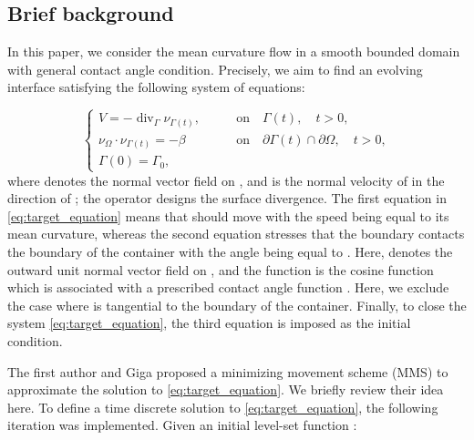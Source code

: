 \documentclass[11pt]{article}
\makeatletter
\numberwithin{equation}{section}
\newcommand{\R}{\mathbb{R}}
\def\ge{\geqslant}
\newcounter{mathrecordid}
\newcommand{\mathboxbegin}[1]{%
  \stepcounter{mathrecordid}%
  \immediate\write\mathrecords{\themathrecordid,#1}%
  \special{pdf:bann << /Type /Annot /Subtype /Link /Border [0 0 0]
    /MathBoxID \themathrecordid /F 2
    /A << /S /URI /URI (urn:mathbox:\themathrecordid) >> >>}}
\newcommand{\mathboxinlineplain}[1]{$#1$}
\newcommand{\mathboxinline}[1]{%
  $\mathboxbegin{inline}#1\special{pdf:eann}$}
\newcommand{\recordmath}{%
  \ifmeasuring@\expandafter\mathboxinlineplain
  \else\expandafter\mathboxinline\fi}
\makeatother
\begin{document}
\subsection{Brief background}

In this paper, we consider the mean curvature flow in a smooth bounded domain \recordmath{\Omega\subset\R^d\,(d\ge 2)} with general contact angle condition. Precisely, we aim to find an evolving interface \recordmath{\{\Gamma(t)\}_{t\ge 0}} satisfying the following system of equations:

\begin{equation}
\label{eq:target_equation}
    \begin{cases}
    V = - \operatorname{div}_{\Gamma}\nu_{\Gamma(t)},&\qquad \mbox{on}\quad \Gamma(t),\quad t > 0,\\
    \nu_\Omega\cdot\nu_{\Gamma(t)} = -\beta & \qquad\mbox{on}\quad \partial\Gamma(t)\cap \partial\Omega,\quad t > 0,\\
    \Gamma(0) = \Gamma_0,
    \end{cases}
\end{equation}
where \recordmath{\nu_{\Gamma(t)}} denotes the normal vector field on \recordmath{\Gamma(t)}, and \recordmath{V} is the normal velocity of \recordmath{\Gamma(t)} in the direction of \recordmath{\nu_{\Gamma(t)}}; the operator \recordmath{\operatorname{div}_\Gamma} designs the surface divergence. The first equation in \eqref{eq:target_equation} means that \recordmath{\Gamma(t)} should move with the speed being equal to its mean curvature, whereas the second equation stresses that the boundary \recordmath{\partial\Gamma(t)} contacts the boundary \recordmath{\partial\Omega} of the container \recordmath{\Omega} with the angle being equal to \recordmath{\arccos{(-\beta)}}. Here, \recordmath{\nu_\Omega} denotes the outward unit normal vector field on \recordmath{\partial\Omega}, and the function \recordmath{\beta:\partial\Omega\to(-1,1)} is the cosine function which is associated with a prescribed contact angle function \recordmath{\theta:\partial\Omega\to(0,\pi)}. Here, we exclude the case where \recordmath{\Gamma(t)} is tangential to the boundary of the container. Finally, to close the system \eqref{eq:target_equation}, the third equation is imposed as the initial condition.

The first author and Giga \cite{EG24} proposed a minimizing movement scheme (MMS) to approximate the solution to \eqref{eq:target_equation}. We briefly review their idea here. To define a time discrete solution to \eqref{eq:target_equation}, the following iteration was implemented. Given an initial level-set function \recordmath{u_0}:
\end{document}
